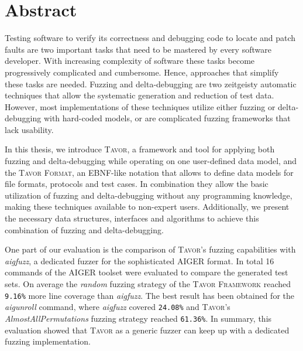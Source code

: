\chapter*{Abstract}

Testing software to verify its correctness and debugging code to locate and patch faults are two important tasks that need to be mastered by every software developer. With increasing complexity of software these tasks become progressively complicated and cumbersome. Hence, approaches that simplify these tasks are needed. Fuzzing and delta-debugging are two zeitgeisty automatic techniques that allow the systematic generation and reduction of test data. However, most implementations of these techniques utilize either fuzzing or delta-debugging with hard-coded models, or are complicated fuzzing frameworks that lack usability.

In this thesis, we introduce \textsc{Tavor}, a framework and tool for applying both fuzzing and delta-debugging while operating on one user-defined data model, and the \textsc{Tavor Format}, an EBNF-like notation that allows to define data models for file formats, protocols and test cases. In combination they allow the basic utilization of fuzzing and delta-debugging without any programming knowledge, making these techniques available to non-expert users. Additionally, we present the necessary data structures, interfaces and algorithms to achieve this combination of fuzzing and delta-debugging.

One part of our evaluation is the comparison of \textsc{Tavor}'s fuzzing capabilities with \emph{aigfuzz}, a dedicated fuzzer for the sophisticated AIGER format. In total 16 commands of the AIGER toolset were evaluated to compare the generated test sets. On average the \emph{random} fuzzing strategy of the \textsc{Tavor Framework} reached \texttt{9.16\%} more line coverage than \emph{aigfuzz}. The best result has been obtained for the \emph{aigunroll} command, where \emph{aigfuzz} covered \texttt{24.08\%} and \textsc{Tavor}'s \emph{AlmostAllPermutations} fuzzing strategy reached \texttt{61.36\%}. In summary, this evaluation showed that \textsc{Tavor} as a generic fuzzer can keep up with a dedicated fuzzing implementation.
